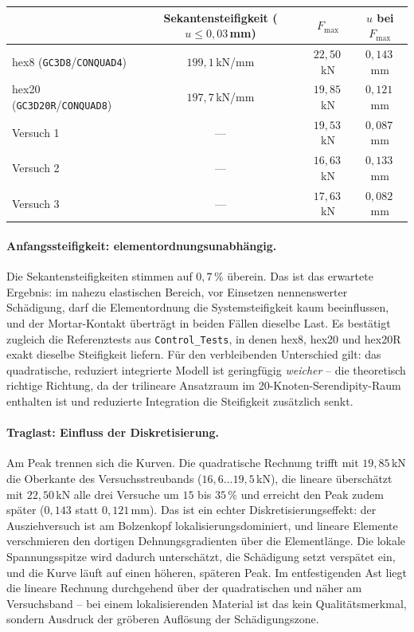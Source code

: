 \documentclass[a4paper,11pt]{article}
\newcommand{\code}[1]{\texttt{\small #1}}
\newcommand{\file}[1]{\texttt{\small #1}}
\begin{document}
\begin{center}
\small
\begin{tabular}{lccc}
\toprule
 & Sekantensteifigkeit ($u\le0{,}03$\,mm) & $F_{\max}$ & $u$ bei $F_{\max}$ \\
\midrule
hex8 (\code{GC3D8}/\code{CONQUAD4})    & $199{,}1$\,kN/mm & $22{,}50$\,kN & $0{,}143$\,mm \\
hex20 (\code{GC3D20R}/\code{CONQUAD8}) & $197{,}7$\,kN/mm & $19{,}85$\,kN & $0{,}121$\,mm \\
\midrule
Versuch 1 & --- & $19{,}53$\,kN & $0{,}087$\,mm \\
Versuch 2 & --- & $16{,}63$\,kN & $0{,}133$\,mm \\
Versuch 3 & --- & $17{,}63$\,kN & $0{,}082$\,mm \\
\bottomrule
\end{tabular}
\end{center}

\paragraph{Anfangssteifigkeit: elementordnungsunabhängig.}
Die Sekantensteifigkeiten stimmen auf $0{,}7\,\%$ überein. Das ist das erwartete Ergebnis: im
nahezu elastischen Bereich, vor Einsetzen nennenswerter Schädigung, darf die Elementordnung die
Systemsteifigkeit kaum beeinflussen, und der Mortar-Kontakt überträgt in beiden Fällen dieselbe
Last. Es bestätigt zugleich die Referenztests aus \file{Control\_Tests}, in denen hex8, hex20 und
hex20R exakt dieselbe Steifigkeit liefern. Für den verbleibenden Unterschied gilt: das
quadratische, reduziert integrierte Modell ist geringfügig \emph{weicher} -- die theoretisch
richtige Richtung, da der trilineare Ansatzraum im 20-Knoten-Serendipity-Raum enthalten ist und
reduzierte Integration die Steifigkeit zusätzlich senkt.

\paragraph{Traglast: Einfluss der Diskretisierung.}
Am Peak trennen sich die Kurven. Die quadratische Rechnung trifft mit $19{,}85$\,kN die Oberkante
des Versuchsstreubands ($16{,}6\ldots19{,}5$\,kN), die lineare überschätzt mit $22{,}50$\,kN alle
drei Versuche um $15$ bis $35\,\%$ und erreicht den Peak zudem später ($0{,}143$ statt
$0{,}121$\,mm). Das ist ein echter Diskretisierungseffekt: der Ausziehversuch ist am Bolzenkopf
lokalisierungsdominiert, und lineare Elemente verschmieren den dortigen Dehnungsgradienten über die
Elementlänge. Die lokale Spannungsspitze wird dadurch unterschätzt, die Schädigung setzt verspätet
ein, und die Kurve läuft auf einen höheren, späteren Peak. Im entfestigenden Ast liegt die lineare
Rechnung durchgehend über der quadratischen und näher am Versuchsband -- bei einem
lokalisierenden Material ist das kein Qualitätsmerkmal, sondern Ausdruck der gröberen Auflösung der
Schädigungszone.
\end{document}
